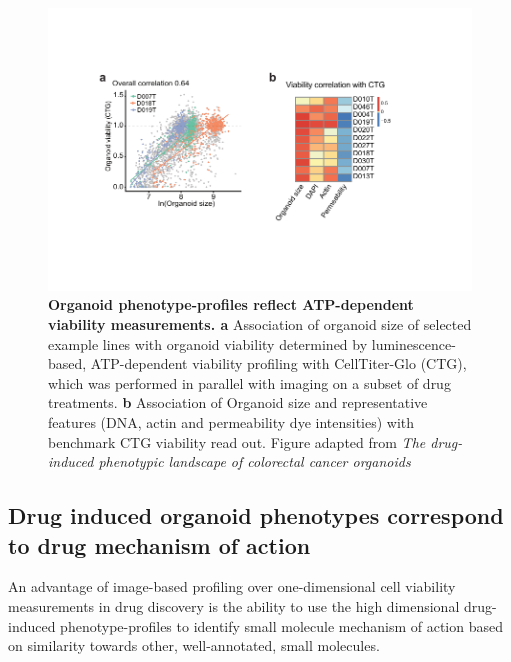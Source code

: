 \begin{flushleft}
\clearpage
\begin{figure}[h]
\centering
\includegraphics[width=\textwidth,
                height=\textheight,
                keepaspectratio]{figures/promise/pdf/fig_2_3_2.pdf}
\caption[Organoid phenotype-profiles reflect ATP-dependent viability measurements]{\textbf{Organoid phenotype-profiles reflect ATP-dependent viability measurements. a} Association of organoid size of selected example lines with organoid viability determined by luminescence-based, ATP-dependent viability profiling with CellTiter-Glo (CTG), which was performed in parallel with imaging on a subset of drug treatments. \textbf{b} Association of Organoid size and representative features (DNA, actin and permeability dye intensities) with benchmark CTG viability read out. Figure adapted from \textit{The drug-induced phenotypic landscape of colorectal cancer organoids} \parencite{betgeDruginducedPhenotypicLandscape2022}}
\label{fig_223}
\end{figure}
\bigbreak

\subsection{Drug induced organoid phenotypes correspond to drug mechanism of action}

An advantage of image-based profiling over one-dimensional cell viability measurements in drug discovery is the ability to use the high dimensional drug-induced phenotype-profiles to identify small molecule mechanism of action based on similarity towards other, well-annotated, small molecules. 


\end{flushleft}
